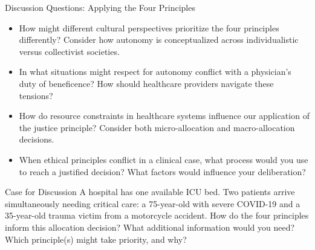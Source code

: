 \documentclass{beamer}
\begin{document}
	\begin{frame}{Discussion Questions: Applying the Four Principles}
		\begin{itemize}
			\item How might different cultural perspectives prioritize the four principles differently? Consider how autonomy is conceptualized across individualistic versus collectivist societies.
			\item In what situations might respect for autonomy conflict with a physician's duty of beneficence? How should healthcare providers navigate these tensions?
			\item How do resource constraints in healthcare systems influence our application of the justice principle? Consider both micro-allocation and macro-allocation decisions.
			\item When ethical principles conflict in a clinical case, what process would you use to reach a justified decision? What factors would influence your deliberation?
		\end{itemize}
		
		\begin{exampleblock}{Case for Discussion}
			\scriptsize
			A hospital has one available ICU bed. Two patients arrive simultaneously needing critical care: a 75-year-old with severe COVID-19 and a 35-year-old trauma victim from a motorcycle accident. How do the four principles inform this allocation decision? What additional information would you need? Which principle(s) might take priority, and why?
		\end{exampleblock}
	\end{frame}
	
\end{document}

